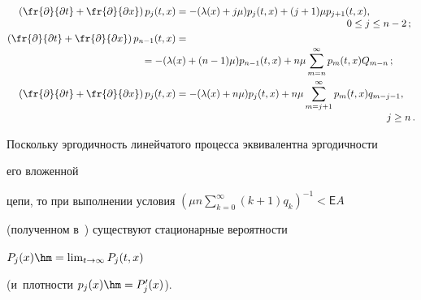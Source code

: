 \begin{align}

\label{s1}

\left ( \fr{\partial}{\partial t}+\fr{\partial }{\partial x}\right )p_j(t,x)

&=-(\lambda(x) + j\mu)p_j(t,x)+(j+1)\mu p_{j+1}(t,x), \notag\\[-3pt]

&\hspace*{60mm}0\le j\le n-2\,;

\\

\label{s2}

\left ( \fr{\partial}{\partial t}+\fr{\partial}{\partial x}\right )p_{n-1}(t,x)&={}\notag\\[-2pt]

&\hspace*{-12mm}{}=

-(\lambda(x) + (n-1)\mu)p_{n-1}(t,x)+ n\mu \sum\limits_{m=n}^\infty p_{m}(t,x)Q_{m-n}\,;

\\

\left (\fr{\partial }{\partial t}+\fr{\partial }{\partial x}\right )p_j(t,x)

&=

-(\lambda(x) + n\mu)p_{j}(t,x)+n\mu\sum\limits_{m=j+1}^\infty p_{m}(t,x) q_{m-j-1},\notag \\[-3pt]

&\hspace*{74mm}j \ge n\,.

\label{s3}

\end{align}



\vspace*{-2pt}



\noindent

Поскольку эргодичность линейчатого процесса эквивалентна эргодичности 

его вложенной

цепи, то при выполнении условия ${( \mu n \sum\nolimits_{k=0}^\infty (k+1)q_k)^{-1}<\mathsf{E}A}$ 

(полученном в~\cite{11}) существуют стационарные вероятности

${P_j(x)\hm=\lim\nolimits_{t\rightarrow\infty}P_j(t,x)}$

(и~плот\-ности ${p_j(x)\hm=P'_j(x)}$).



